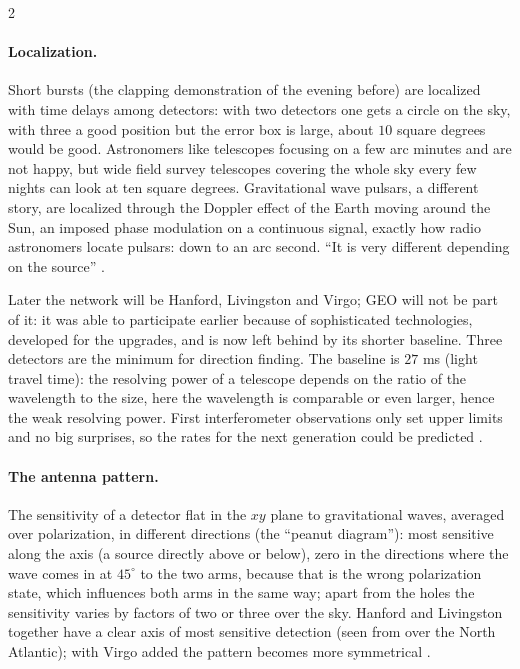 \begin{paracol}{2}
\paragraph{Localization.} Short bursts (the clapping demonstration of the evening before) are localized with time delays among detectors: with two detectors one gets a circle on the sky, with three a good position but the error box is large, about $10$ square degrees would be good. Astronomers like telescopes focusing on a few arc minutes and are not happy, but wide field survey telescopes covering the whole sky every few nights can look at ten square degrees. Gravitational wave pulsars, a different story, are localized through the Doppler effect of the Earth moving around the Sun, an imposed phase modulation on a continuous signal, exactly how radio astronomers locate pulsars: down to an arc second. ``It is very different depending on the source'' .

Later the network will be Hanford, Livingston and Virgo; GEO will not be part of it: it was able to participate earlier because of sophisticated technologies, developed for the upgrades, and is now left behind by its shorter baseline. Three detectors are the minimum for direction finding. The baseline is $27$ ms (light travel time): the resolving power of a telescope depends on the ratio of the wavelength to the size, here the wavelength is comparable or even larger, hence the weak resolving power. First interferometer observations only set upper limits and no big surprises, so the rates for the next generation could be predicted .

\paragraph{The antenna pattern.} The sensitivity of a detector flat in the $xy$ plane to gravitational waves, averaged over polarization, in different directions (the ``peanut diagram''): most sensitive along the axis (a source directly above or below), zero in the directions where the wave comes in at $45^\circ$ to the two arms, because that is the wrong polarization state, which influences both arms in the same way; apart from the holes the sensitivity varies by factors of two or three over the sky. Hanford and Livingston together have a clear axis of most sensitive detection (seen from over the North Atlantic); with Virgo added the pattern becomes more symmetrical .


\end{paracol}
